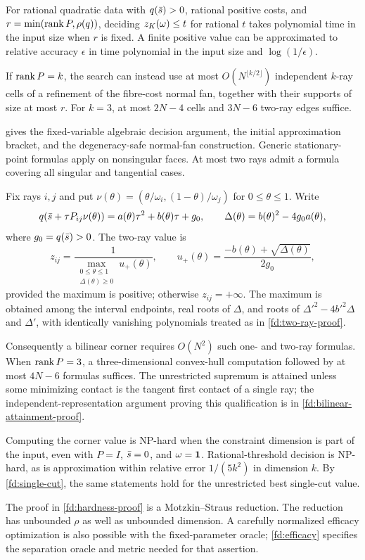 \begin{theorem}\label{fd:algorithms}
For rational quadratic data with $q(\bar s)>0$, rational positive costs, and
$r=\min(\operatorname{rank} P,\rho(q))$, deciding $z_K(\omega)\le t$ for rational $t$ takes
polynomial time in the input size when $r$ is fixed. A finite positive
value can be approximated to relative accuracy $\epsilon$ in time
polynomial in the input size and $\log(1/\epsilon)$.

If $\operatorname{rank} P=k$, the search can instead use at most
$O(N^{\lfloor k/2\rfloor})$ independent $k$-ray cells of a refinement
of the fibre-cost normal fan, together with their supports of size at
most $r$. For $k=3$, at most $2N-4$ cells and $3N-6$ two-ray edges suffice.
\end{theorem}
 gives the fixed-variable algebraic decision
argument, the initial approximation bracket, and the degeneracy-safe
normal-fan construction. Generic stationary-point formulas apply on
nonsingular faces. At most two rays admit a formula covering all singular
and tangential cases.

\begin{proposition}\label{fd:two-ray}
Fix rays $i,j$ and put
$\nu(\theta)=(\theta/\omega_i,(1-\theta)/\omega_j)$ for
$0\le\theta\le1$. Write
\[
 q(\bar s+\tau P_{ij}\nu(\theta))
 =a(\theta)\tau^2+b(\theta)\tau+g_0,
 \qquad \Delta(\theta)=b(\theta)^2-4g_0a(\theta),
\]
where $g_0=q(\bar s)>0$. The two-ray value is
\[
 z_{ij}=\frac{1}{\displaystyle\max_{\substack{0\le\theta\le1\\\Delta(\theta)\ge0}}
 u_+(\theta)},\qquad
 u_+(\theta)=\frac{-b(\theta)+\sqrt{\Delta(\theta)}}{2g_0},
\]
provided the maximum is positive; otherwise $z_{ij}=+\infty$.
The maximum is obtained among the interval endpoints, real roots of $\Delta$,
and roots of $\Delta'^2-4b'^2\Delta$ and $\Delta'$, with identically vanishing
polynomials treated as in \cref{fd:two-ray-proof}.
\end{proposition}
Consequently a bilinear corner requires $O(N^2)$ such one- and two-ray
formulas. When $\operatorname{rank} P=3$, a three-dimensional convex-hull computation
followed by at most $4N-6$ formulas suffices. The unrestricted supremum
is attained unless some minimizing contact is the tangent first contact
of a single ray; the independent-representation argument proving this
qualification is in \cref{fd:bilinear-attainment-proof}.

\begin{theorem}\label{fd:hardness}
Computing the corner value is NP-hard when the constraint dimension is
part of the input, even with $P=I$, $\bar s=0$, and $\omega=\mathbf1$.
Rational-threshold decision is NP-hard, as is approximation within
relative error $1/(5k^2)$ in dimension $k$. By \cref{fd:single-cut}, the
same statements hold for the unrestricted best single-cut value.
\end{theorem}
The proof in \cref{fd:hardness-proof} is a Motzkin--Straus reduction.
The reduction has unbounded $\rho$ as well as unbounded dimension.
A carefully normalized efficacy optimization is also possible with the
fixed-parameter oracle; \cref{fd:efficacy} specifies the separation oracle
and metric needed for that assertion.

